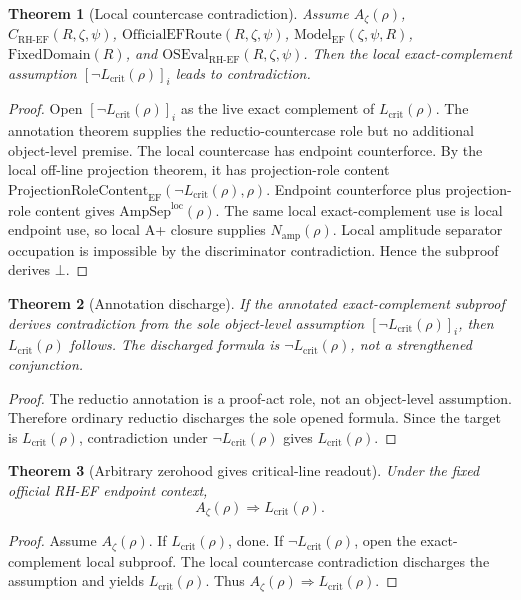 \documentclass[11pt]{article}
\newtheorem{theorem}{Theorem}[section]
\newcommand{\Az}{A_{\zeta}}
\newcommand{\Lcrit}{L_{\mathrm{crit}}}
\newcommand{\FixedDomain}{\mathrm{FixedDomain}}
\newcommand{\CRHEF}{C_{\mathrm{RH}\text{-}\mathrm{EF}}}
\newcommand{\ModelEF}{\mathrm{Model}_{\mathrm{EF}}}
\newcommand{\OfficialEFRoute}{\mathrm{OfficialEFRoute}}
\newcommand{\OSEvalEF}{\mathrm{OSEval}_{\mathrm{RH}\text{-}\mathrm{EF}}}
\newcommand{\AmpSepLoc}{\mathrm{AmpSep}^{\mathrm{loc}}}
\newcommand{\Namp}{N_{\mathrm{amp}}}
\newcommand{\ProjRoleEF}{\mathrm{ProjectionRoleContent}_{\mathrm{EF}}}
\begin{document}
\begin{theorem}[Local countercase contradiction]
Assume \(\Az(\rho)\), \(\CRHEF(R,\zeta,\psi)\), \(\OfficialEFRoute(R,\zeta,\psi)\), \(\ModelEF(\zeta,\psi,R)\), \(\FixedDomain(R)\), and \(\OSEvalEF(R,\zeta,\psi)\).  Then the local exact-complement assumption \([\neg\Lcrit(\rho)]_i\) leads to contradiction.
\end{theorem}

\begin{proof}
Open \([\neg\Lcrit(\rho)]_i\) as the live exact complement of \(\Lcrit(\rho)\).  The annotation theorem supplies the reductio-countercase role but no additional object-level premise.  The local countercase has endpoint counterforce.  By the local off-line projection theorem, it has projection-role content \(\ProjRoleEF(\neg\Lcrit(\rho),\rho)\).  Endpoint counterforce plus projection-role content gives \(\AmpSepLoc(\rho)\).  The same local exact-complement use is local endpoint use, so local A+ closure supplies \(\Namp(\rho)\).  Local amplitude separator occupation is impossible by the discriminator contradiction.  Hence the subproof derives \(\bot\).
\end{proof}

\begin{theorem}[Annotation discharge]
If the annotated exact-complement subproof derives contradiction from the sole object-level assumption \([\neg\Lcrit(\rho)]_i\), then \(\Lcrit(\rho)\) follows.  The discharged formula is \(\neg\Lcrit(\rho)\), not a strengthened conjunction.
\end{theorem}

\begin{proof}
The reductio annotation is a proof-act role, not an object-level assumption.  Therefore ordinary reductio discharges the sole opened formula.  Since the target is \(\Lcrit(\rho)\), contradiction under \(\neg\Lcrit(\rho)\) gives \(\Lcrit(\rho)\).
\end{proof}

\begin{theorem}[Arbitrary zerohood gives critical-line readout]
Under the fixed official RH-EF endpoint context,
\[
\Az(\rho)\Rightarrow \Lcrit(\rho).
\]
\end{theorem}

\begin{proof}
Assume \(\Az(\rho)\).  If \(\Lcrit(\rho)\), done.  If \(\neg\Lcrit(\rho)\), open the exact-complement local subproof.  The local countercase contradiction discharges the assumption and yields \(\Lcrit(\rho)\).  Thus \(\Az(\rho)\Rightarrow\Lcrit(\rho)\).
\end{proof}
\end{document}
